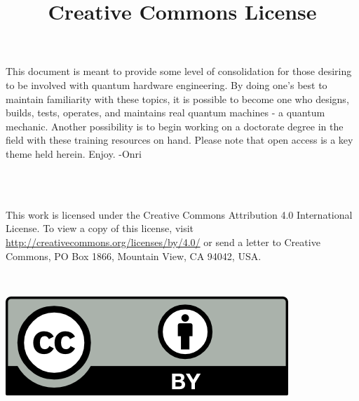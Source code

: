\large{This document is meant to provide some level of consolidation for those desiring to be involved with quantum hardware engineering. By doing one's best to maintain familiarity with these topics, it is possible to become one who designs, builds, tests, operates, and maintains real quantum machines - a quantum mechanic. Another possibility is to begin working on a doctorate degree in the field with these training resources on hand. Please note that open access is a key theme held herein. Enjoy. -Onri
}
\\ 
\space
\\

\begin{flushleft}
\title{\Large\textbf{Creative Commons License}}\\
\end{flushleft}
{

\large This work is licensed under the Creative Commons Attribution 4.0 International License. To view a copy of this license, visit \url{http://creativecommons.org/licenses/by/4.0/} or send a letter to Creative Commons, PO Box 1866, Mountain View, CA 94042, USA.
}\\

\begin{center}

\includegraphics{by.png}

\end{center}
